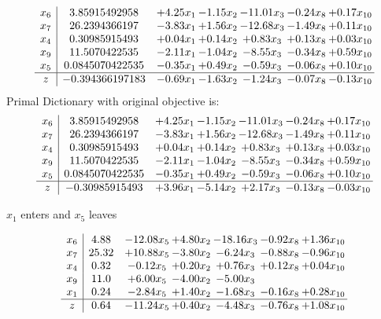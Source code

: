 \documentclass[8pt]{article}
\begin{document}
\[\begin{array}{c| c c@{\hskip 2pt} c@{\hskip 2pt} c@{\hskip 2pt} c@{\hskip 2pt} c@{\hskip 2pt} }
 x_{6}   &  3.85915492958 & +  4.25 x_{1} & -1.15 x_{2} & -11.01 x_{3} & -0.24 x_{8} & +  0.17 x_{10}\\
 x_{7}   &  26.2394366197 & -3.83 x_{1} & +  1.56 x_{2} & -12.68 x_{3} & -1.49 x_{8} & +  0.11 x_{10}\\
 x_{4}   &  0.30985915493 & +  0.04 x_{1} & +  0.14 x_{2} & +  0.83 x_{3} & +  0.13 x_{8} & +  0.03 x_{10}\\
 x_{9}   &  11.5070422535 & -2.11 x_{1} & -1.04 x_{2} & -8.55 x_{3} & -0.34 x_{8} & +  0.59 x_{10}\\
 x_{5}   &  0.0845070422535 & -0.35 x_{1} & +  0.49 x_{2} & -0.59 x_{3} & -0.06 x_{8} & +  0.10 x_{10}\\
\hline
z    &  -0.394366197183 & -0.69 x_{1} & -1.63 x_{2} & -1.24 x_{3} & -0.07 x_{8} & -0.13 x_{10}\\
\end{array}\]
Primal Dictionary with original objective is:
\[\begin{array}{c| c c@{\hskip 2pt} c@{\hskip 2pt} c@{\hskip 2pt} c@{\hskip 2pt} c@{\hskip 2pt} }
 x_{6}   &  3.85915492958 & +  4.25 x_{1} & -1.15 x_{2} & -11.01 x_{3} & -0.24 x_{8} & +  0.17 x_{10}\\
 x_{7}   &  26.2394366197 & -3.83 x_{1} & +  1.56 x_{2} & -12.68 x_{3} & -1.49 x_{8} & +  0.11 x_{10}\\
 x_{4}   &  0.30985915493 & +  0.04 x_{1} & +  0.14 x_{2} & +  0.83 x_{3} & +  0.13 x_{8} & +  0.03 x_{10}\\
 x_{9}   &  11.5070422535 & -2.11 x_{1} & -1.04 x_{2} & -8.55 x_{3} & -0.34 x_{8} & +  0.59 x_{10}\\
 x_{5}   &  0.0845070422535 & -0.35 x_{1} & +  0.49 x_{2} & -0.59 x_{3} & -0.06 x_{8} & +  0.10 x_{10}\\
\hline
z    &  -0.30985915493 & +  3.96 x_{1} & -5.14 x_{2} & +  2.17 x_{3} & -0.13 x_{8} & -0.03 x_{10}\\
\end{array}\]


 $ x_{1} $ enters and $ x_{5} $ leaves 

 \[\begin{array}{c| c c@{\hskip 2pt} c@{\hskip 2pt} c@{\hskip 2pt} c@{\hskip 2pt} c@{\hskip 2pt} }
 x_{6}   &  4.88 & -12.08 x_{5} & +  4.80 x_{2} & -18.16 x_{3} & -0.92 x_{8} & +  1.36 x_{10}\\
 x_{7}   &  25.32 & + 10.88 x_{5} & -3.80 x_{2} & -6.24 x_{3} & -0.88 x_{8} & -0.96 x_{10}\\
 x_{4}   &  0.32 & -0.12 x_{5} & +  0.20 x_{2} & +  0.76 x_{3} & +  0.12 x_{8} & +  0.04 x_{10}\\
 x_{9}   &  11.0 & +  6.00 x_{5} & -4.00 x_{2} & -5.00 x_{3} &    &   \\
 x_{1}   &  0.24 & -2.84 x_{5} & +  1.40 x_{2} & -1.68 x_{3} & -0.16 x_{8} & +  0.28 x_{10}\\
\hline
z    &  0.64 & -11.24 x_{5} & +  0.40 x_{2} & -4.48 x_{3} & -0.76 x_{8} & +  1.08 x_{10}\\
\end{array}\]
\end{document}
